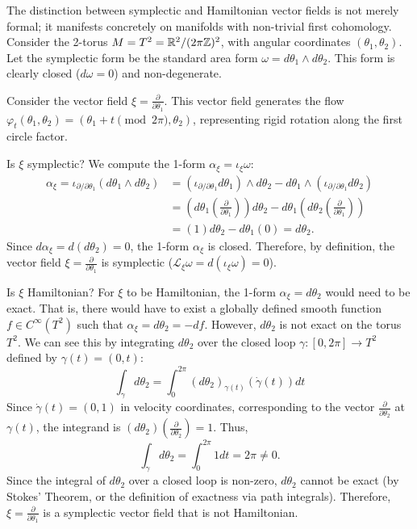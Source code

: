 \begin{example}
\label{ex:t2_symp_non_ham}
The distinction between symplectic and Hamiltonian vector fields is not merely formal; it manifests concretely on manifolds with non-trivial first cohomology. Consider the 2-torus $M = T^2 = \mathbb{R}^2 / (2\pi\mathbb{Z})^2$, with angular coordinates $(\theta_1, \theta_2)$. Let the symplectic form be the standard area form $\omega = d\theta_1 \wedge d\theta_2$. This form is clearly closed ($d\omega = 0$) and non-degenerate.

Consider the vector field $\xi = \frac{\partial}{\partial\theta_1}$. This vector field generates the flow $\varphi_t(\theta_1, \theta_2) = (\theta_1 + t \pmod{2\pi}, \theta_2)$, representing rigid rotation along the first circle factor.

Is $\xi$ symplectic? We compute the 1-form $\alpha_\xi = \iota_\xi \omega$:
\begin{align*} \alpha_\xi = \iota_{\partial/\partial\theta_1} (d\theta_1 \wedge d\theta_2) &= (\iota_{\partial/\partial\theta_1} d\theta_1) \wedge d\theta_2 - d\theta_1 \wedge (\iota_{\partial/\partial\theta_1} d\theta_2) \\ &= (d\theta_1(\tfrac{\partial}{\partial\theta_1})) d\theta_2 - d\theta_1 (d\theta_2(\tfrac{\partial}{\partial\theta_1})) \\ &= (1) d\theta_2 - d\theta_1 (0) = d\theta_2. \end{align*}
Since $d\alpha_\xi = d(d\theta_2) = 0$, the 1-form $\alpha_\xi$ is closed. Therefore, by definition, the vector field $\xi = \frac{\partial}{\partial\theta_1}$ is symplectic ($\mathcal{L}_\xi \omega = d(\iota_\xi \omega) = 0$).

Is $\xi$ Hamiltonian? For $\xi$ to be Hamiltonian, the 1-form $\alpha_\xi = d\theta_2$ would need to be exact. That is, there would have to exist a globally defined smooth function $f \in C^\infty(T^2)$ such that $\alpha_\xi = d\theta_2 = -df$. However, $d\theta_2$ is not exact on the torus $T^2$. We can see this by integrating $d\theta_2$ over the closed loop $\gamma: [0, 2\pi] \to T^2$ defined by $\gamma(t) = (0, t)$:
\[ \int_\gamma d\theta_2 = \int_0^{2\pi} (d\theta_2)_{\gamma(t)}(\dot{\gamma}(t)) dt \]
Since $\dot{\gamma}(t) = (0, 1)$ in velocity coordinates, corresponding to the vector $\frac{\partial}{\partial\theta_2}$ at $\gamma(t)$, the integrand is $(d\theta_2)(\frac{\partial}{\partial\theta_2}) = 1$. Thus,
\[ \int_\gamma d\theta_2 = \int_0^{2\pi} 1 dt = 2\pi \neq 0. \]
Since the integral of $d\theta_2$ over a closed loop is non-zero, $d\theta_2$ cannot be exact (by Stokes' Theorem, or the definition of exactness via path integrals). Therefore, $\xi = \frac{\partial}{\partial\theta_1}$ is a symplectic vector field that is not Hamiltonian.


\end{example}
